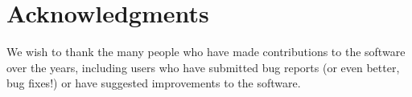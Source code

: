 %
%


\section*{Acknowledgments} 

We wish to thank the many people who have made contributions to the 
\clawpack software over the years, including users who have submitted bug
reports (or even better, bug fixes!) or have suggested
improvements to the software.  



